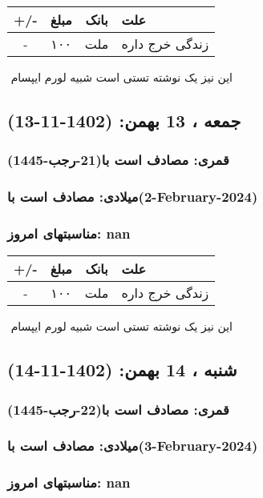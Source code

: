 \documentclass{article}
\newcommand{\rnote}[1]{\marginpar{\textcolor{color}{\StrSubstitute{\##1}{ }{\_}}}}
\newcommand{\myRow}[4]{
    #1 & #2 & #3 & #4 \\ \hline
}
\begin{document}
\begin{tabular}{ | c | c | c | p{5cm} |}
    \hline
    \myRow{ +/- }{مبلغ}{بانک}{علت}
    \myRow{-}{۱۰۰}{ملت}{زندگی خرج داره}
\end{tabular}
\newline
\newline

‌
\rnote{تست}
این نیز یک نوشته تستی است شبیه لورم ایپسام




\newpage
{}
\textcolor{color}{
\section{ جمعه ، 13 بهمن: (1402-11-13) }
\subsubsection*{قمری: مصادف است با(21-رجب-1445)} 
\subsubsection*{میلادی: مصادف است با(2-February-2024)}
\subsubsection*{مناسبتهای امروز: nan}
}


\begin{tabular}{ | c | c | c | p{5cm} |}
    \hline
    \myRow{ +/- }{مبلغ}{بانک}{علت}
    \myRow{-}{۱۰۰}{ملت}{زندگی خرج داره}
\end{tabular}
\newline
\newline

‌
\rnote{تست}
این نیز یک نوشته تستی است شبیه لورم ایپسام




\newpage
{}
\textcolor{color}{
\section{ شنبه ، 14 بهمن: (1402-11-14) }
\subsubsection*{قمری: مصادف است با(22-رجب-1445)} 
\subsubsection*{میلادی: مصادف است با(3-February-2024)}
\subsubsection*{مناسبتهای امروز: nan}
}
\end{document}

